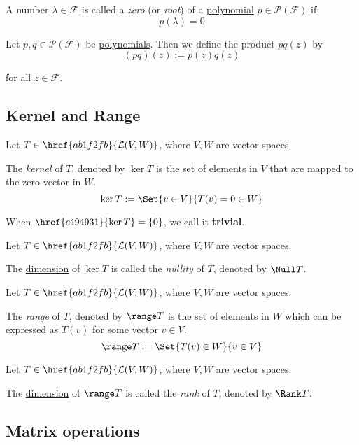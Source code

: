 \label{addeddc}

A number $\lambda\in\mathcal F$ is called a \textit{zero} (or \textit{root}) of
a \href{df84c07}{polynomial} $p\in\mathcal P(\mathcal F)$ if
$$
  p(\lambda)=0
$$

\label{e0f83ed}

Let $p,q\in\mathcal P(\mathcal F)$ be \href{df84c07}{polynomials}. Then we
define the product $pq(z)$ by
$$
  (pq)(z):=p(z)q(z)
$$

for all $z\in\mathcal F$.

\subsection{Kernel and Range}\label{a82c0bd}

\label{c494931}

Let $T\in\href{ab1f2fb}{\mathcal L(V,W)}$, where $V,W$ are vector spaces.

The \textit{kernel} of $T$, denoted by $\ker T$ is the set of elements in $V$
that are mapped to the zero vector in $W$.
$$
  \ker T:=\Set{v\in V}{T(v)=0\in W}
$$

\label{f532630}

When $\href{c494931}{\ker T}=\{0\}$, we call it \textbf{trivial}.

\label{a6bc328}

Let $T\in\href{ab1f2fb}{\mathcal L(V,W)}$, where $V,W$ are vector spaces.

The \href{cd4284b}{dimension} of $\ker T$ is called the \textit{nullity} of
$T$, denoted by $\Null T$.

\label{a3ef003}

Let $T\in\href{ab1f2fb}{\mathcal L(V,W)}$, where $V,W$ are vector spaces.

The \textit{range} of $T$, denoted by $\range T$ is the set of elements in $W$
which can be expressed as $T(v)$ for some vector $v\in V$.
$$
  \range T:=\Set{T(v)\in W}{v\in V}
$$

\label{ca0f3c2}

Let $T\in\href{ab1f2fb}{\mathcal L(V,W)}$, where $V,W$ are vector spaces.

The \href{cd4284b}{dimension} of $\range T$ is called the \textit{rank} of $T$,
denoted by $\Rank T$.

\subsection{Matrix operations}\label{b93c2d0}


